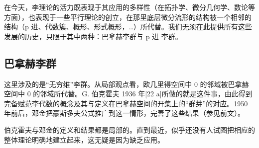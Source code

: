 在今天，李理论的活力既表现于其应用的多样性（在拓扑学、微分几何学、数论等方面），也表现于一些平行理论的创立，在那里底层微分流形的结构被一个相邻的结构（p 进、代数簇、概形、形式概形，\ldots）所代替。我们无须在此提供所有这些发展的历史，只限于其中两种：巴拿赫李群与 p 进 李群。

\subsection{巴拿赫李群}

这里涉及的是“无穷维”李群。从局部观点看，欧几里得空间中 0 的邻域被巴拿赫空间中 0 的邻域所代替。G. 伯克霍夫 1936 年{[}22 a{]}所做的就是这件事，由此得到完备赋范李代数的概念及其与定义在巴拿赫空间的开集上的“群芽”的对应。1950 年前后，邓金把豪斯多夫公式推广到这一情形，完善了这些结果（参见前文）。

伯克霍夫与邓金的定义和结果都是局部的。直到最近，似乎还没有人试图把相应的整体理论明确地建立起来，这无疑是因为缺乏应用。
